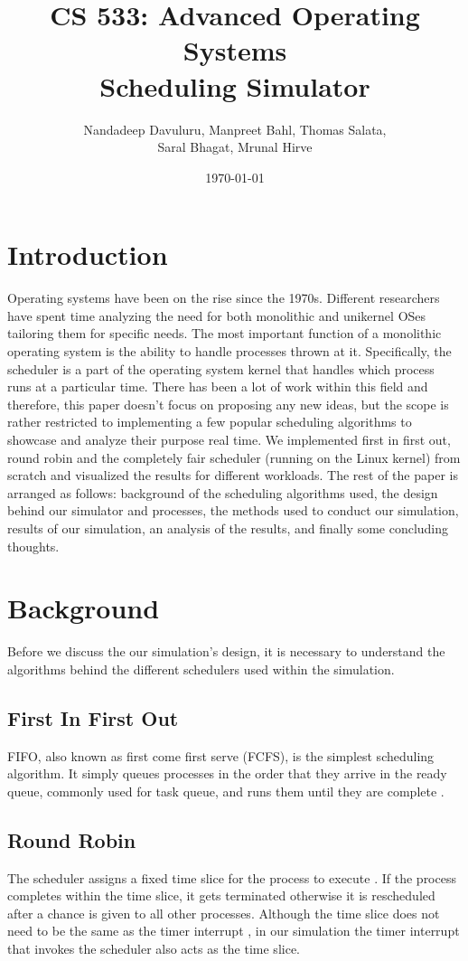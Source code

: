 \documentclass[a4paper]{article}
\title{CS 533: Advanced Operating Systems\\ Scheduling Simulator}
\author{Nandadeep Davuluru, Manpreet Bahl, Thomas Salata,\\ Saral Bhagat, Mrunal Hirve}
\date{\today}
\begin{document}
\maketitle


\section{Introduction}
\label{sec:introduction}

Operating systems have been on the rise since the 1970s. Different researchers have spent time analyzing the need for both monolithic and unikernel OSes tailoring them for specific needs. The most important function of a monolithic operating system is the ability to handle processes thrown at it. Specifically, the scheduler is a part of the operating system kernel that handles which process runs at a particular time. There has been a lot of work within this field and therefore, this paper doesn’t focus on proposing any new ideas, but the scope is rather restricted to implementing a few popular scheduling algorithms to showcase and analyze their purpose real time. We implemented first in first out, round robin and the completely fair scheduler (running on the Linux kernel) from scratch and visualized the results for different workloads. The rest of the paper is arranged as follows: background of the scheduling algorithms used, the design behind our simulator and processes, the methods used to conduct our simulation, results of our simulation, an analysis of the results, and finally some concluding thoughts.

\section{Background}
\label{sec:background}
Before we discuss the our simulation’s design, it is necessary to understand the algorithms behind the different schedulers used within the simulation.

\subsection{First In First Out}
FIFO, also known as first come first serve (FCFS), is the simplest scheduling algorithm. It simply queues processes in the order that they arrive in the ready queue, commonly used for task queue, and runs them until they are complete \cite{walpole}.

\subsection{Round Robin}
The scheduler assigns a fixed time slice for the process to execute \cite{walpole}. If the process completes within the time slice, it gets terminated otherwise it is rescheduled after a chance is given to all other processes. Although the time slice does not need to be the same as the timer interrupt \cite{walpole}, in our simulation the timer interrupt that invokes the scheduler also acts as the time slice.
\end{document}
